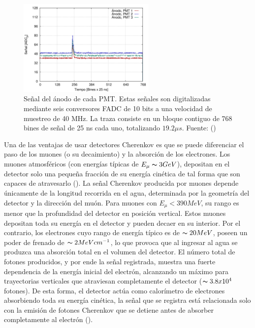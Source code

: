 \begin{figure}[h!]
  \centering
\includegraphics[width=0.6\textwidth]{Figs/PMTs_signal.png}
  \caption{Señal del ánodo de cada PMT. Estas señales son digitalizadas mediante seis conversores FADC de 10 bits a una velocidad de muestreo de 40 MHz. La traza consiste en un bloque contiguo de 768 bines de señal de 25 ns cada uno, totalizando $19.2 \mu s$. Fuente: (\cite{asorey_2012})}
  \label{fig:PMT}
\end{figure}
Una de las ventajas de usar detectores Cherenkov es que se puede diferenciar el paso de los muones (o su decaimiento) y la absorción de los electrones. Los muones atmosféricos (con energías típicas de $E_\mu \thicksim 3GeV$), depositan en el detector solo una pequeña fracción de su energía cinética de tal forma que son capaces de atravesarlo (\cite{asorey_2012}). La señal Cherenkov producida por muones depende únicamente de la longitud recorrida en el agua, determinada por la geometría del detector y la dirección del muón. Para muones con $E_\mu < 390 MeV$, su rango es menor que la profundidad del detector en posición vertical. Estos muones depositan toda su energía en el detector y pueden decaer en su interior.
Por el contrario, los electrones cuyo rango de energía típico es de $\thicksim 20MeV$, poseen un poder de frenado de $\thicksim 2MeV cm^{-1}$, lo que provoca que al ingresar al agua se produzca una absorción total en el volumen del detector. El número total de fotones producidos, y por ende la señal registrada, muestra una fuerte dependencia de la energía inicial del electrón, alcanzando un máximo para trayectorias verticales que atraviesan completamente el detector ($\thicksim 3.8 x 10^{4}$ fotones). De esta forma, el detector actúa como calorímetro de electrones absorbiendo toda su energía cinética, la señal que se registra está relacionada solo con la emisión de fotones Cherenkov que se detiene antes de absorber completamente al electrón (\cite{masias_2017}). 

